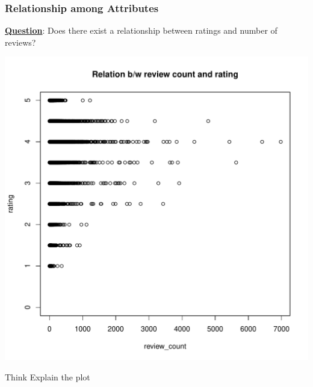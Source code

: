 \documentclass[12pt]{book}\usepackage{knitr}
\begin{document}
\newpage
\subsubsection{Relationship among Attributes}
\noindent \textbf{\underline{Question}}: Does there exist a relationship between ratings and number of reviews?
\begin{knitrout}
\color{fgcolor}\begin{kframe}
\begin{alltt}
\hlopt{$}\hlopt{$}
       \hlstd{=} \hlstd{,}
      \hlstd{=} \hlstd{,}  \hlstd{=} \hlstd{)}
\end{alltt}
\end{kframe}
\includegraphics[width=\maxwidth]{figure/corr_Review_Stars-1} 
\begin{kframe}\begin{alltt}
\end{alltt}
\end{kframe}
\end{knitrout}

\begin{DIY}{Think}
\noindent Explain the plot
\end{DIY}
\end{document}
